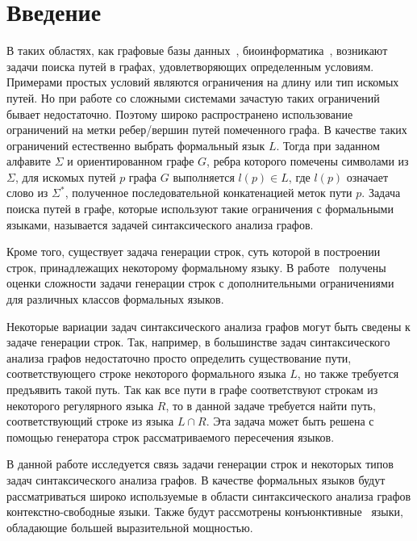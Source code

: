 \section*{Введение}

В таких областях, как графовые базы данных~\cite{azimov-spbu-graphDB}, биоинформатика~\cite{azimov-spbu-Anderson}, возникают задачи поиска путей в графах, удовлетворяющих определенным условиям. Примерами простых условий являются ограничения на длину или тип искомых путей. Но при работе со сложными системами зачастую таких ограничений бывает недостаточно. Поэтому широко распространено использование ограничений на метки ребер/вершин путей помеченного графа. В качестве таких ограничений естественно выбрать формальный язык $L$. Тогда при заданном алфавите $\Sigma$ и ориентированном графе $G$, ребра которого помечены символами из $\Sigma$, для искомых путей $p$ графа $G$ выполняется $l(p) \in L$, где $l(p)$ означает слово из $\Sigma^*$, полученное последовательной конкатенацией меток пути $p$. Задача поиска путей в графе, которые используют такие ограничения с формальными языками, называется задачей синтаксического анализа графов.

Кроме того, существует задача генерации строк, суть которой в построении строк, принадлежащих некоторому формальному языку. В работе~\cite{azimov-spbu-Okhotin} получены оценки сложности задачи генерации строк с дополнительными ограничениями для различных классов формальных языков.

Некоторые вариации задач синтаксического анализа графов могут быть сведены к задаче генерации строк. Так, например, в большинстве задач синтаксического анализа графов недостаточно просто определить существование пути, соответствующего строке некоторого формального языка $L$, но также требуется предъявить такой путь. Так как все пути в графе соответствуют строкам из некоторого регулярного языка $R$, то в данной задаче требуется найти путь, соответствующий строке из языка $L \cap R$. Эта задача может быть решена с помощью генератора строк рассматриваемого пересечения языков.

В данной работе исследуется связь задачи генерации строк и некоторых типов задач синтаксического анализа графов. В качестве формальных языков будут рассматриваться широко используемые в области синтаксического анализа графов контекстно-свободные языки. Также будут рассмотрены конъюнктивные~\cite{azimov-spbu-conjunctiveGrammar} языки, обладающие большей выразительной мощностью.
